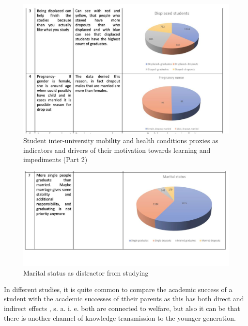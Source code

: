\documentclass[
  letterpaper,
  DIV=11,
  numbers=noendperiod]{scrartcl}
\begin{document}
\begin{figure}

{\centering \includegraphics{./figs/reasons2.jpg}

}

\caption{Student inter-university mobility and health conditions proxies
as indicators and drivers of their motivation towards learning and
impediments (Part 2)}

\end{figure}

\begin{figure}

{\centering \includegraphics{./figs/rasons-3.jpg}

}

\caption{Marital status as distractor from studying}

\end{figure}

In different studies, it is quite common to compare the academic success
of a student with the academic successes of ttheir parents as this has
both direct and indirect effects , s. a. i. e. both are connected to
welfare, but also it can be that there is another channel of knowledge
transmission to the younger generation.
\end{document}
